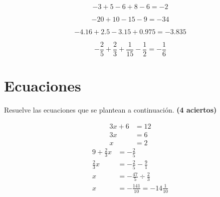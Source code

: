 \documentclass[11pt]{article}
\begin{document}
\begin{multicols}{2}

\begin{equation}
-3 +5 -6 +8 -6 = -2
\end{equation}

\vspace{3cm}
\begin{equation}
-20 +10 -15 -9 = -34
\end{equation}

\vspace{3cm}
\begin{equation}
-4.16 +2.5 -3.15 + 0.975 = -3.835
\end{equation}

\vspace{3cm}
\begin{equation}
- \frac{2}{5} + \frac{2}{3} + \frac{1}{15} - \frac{1}{2} = - \frac{1}{6}
\end{equation}

\vspace{3cm}

\end{multicols}

\newpage

\setcounter{equation}{0}
\section{Ecuaciones}

Resuelve las ecuaciones que se plantean a continuaci\'on. \hfill \textbf{(4 aciertos)}

\begin{multicols}{2}

\begin{align}
3x + 6 &= 12 \\
3x &= 6 \nonumber \\
x &= 2 \nonumber
\end{align}
\vfill 
\vspace{3cm}
\begin{align}
9 + \frac{2}{3} x &= -\frac{2}{5} \\
\frac{2}{3}x &= - \frac{2}{5} - \frac{9}{1} \nonumber \\
x &= - \frac{47}{5} \div \frac{2}{3} \nonumber \\
x &= - \frac{141}{10}  = - 14 \frac{1}{10} \nonumber
\end{align}


\end{multicols}
\end{document}

